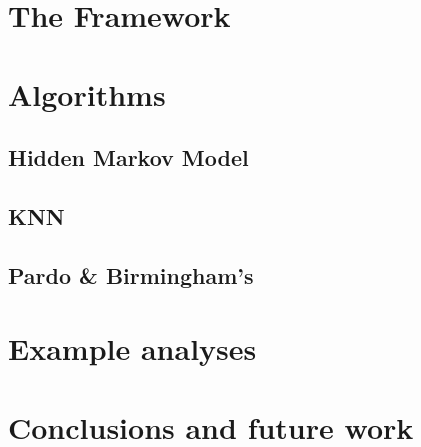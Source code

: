 \section{The Framework}
\label{sec:framework}


\section{Algorithms}
\label{sec:algorithms}

\subsection{Hidden Markov Model}
\label{sec:hidden-markov-model}

\subsection{KNN}
\label{sec:knn}

\subsection{Pardo \& Birmingham's}
\label{sec:pardo--birminghams}

\section{Example analyses}
\label{sec:example-analyses}

\section{Conclusions and future work}
\label{sec:concl-future-work}


